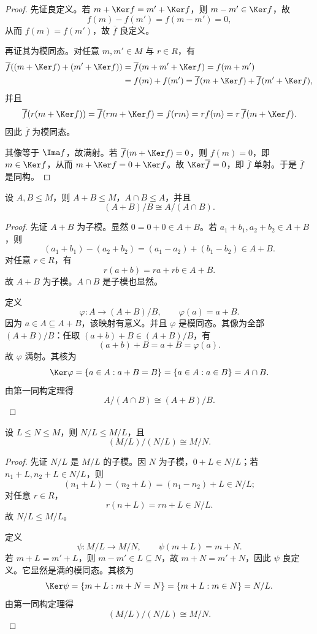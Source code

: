 \begin{proof}
先证良定义。若 $m+\Ker f=m'+\Ker f$，则 $m-m'\in \Ker f$，故
\[
f(m)-f(m')=f(m-m')=0,
\]
从而 $f(m)=f(m')$，故 $\overline f$ 良定义。

再证其为模同态。对任意 $m,m'\in M$ 与 $r\in R$，有
\begin{align*}
\overline f((m+\Ker f)+(m'+\Ker f))
&=\overline f(m+m'+\Ker f)=f(m+m')\\
&=f(m)+f(m')=\overline f(m+\Ker f)+\overline f(m'+\Ker f),
\end{align*}
并且
\[
\overline f(r(m+\Ker f))=\overline f(rm+\Ker f)=f(rm)=rf(m)=r\,\overline f(m+\Ker f).
\]
因此 $\overline f$ 为模同态。

其像等于 $\Ima f$，故满射。若 $\overline f(m+\Ker f)=0$，则 $f(m)=0$，即 $m\in \Ker f$，从而 $m+\Ker f=0+\Ker f$。故 $\Ker \overline f=0$，即 $\overline f$ 单射。于是 $\overline f$ 是同构。
\end{proof}

\begin{theorem}[第二同构定理]
设 $A,B\le M$，则 $A+B\le M$，$A\cap B\le A$，并且
\[
(A+B)/B\cong A/(A\cap B).
\]
\end{theorem}

\begin{proof}
先证 $A+B$ 为子模。显然 $0=0+0\in A+B$。若 $a_1+b_1,a_2+b_2\in A+B$，则
\[
(a_1+b_1)-(a_2+b_2)=(a_1-a_2)+(b_1-b_2)\in A+B.
\]
对任意 $r\in R$，有
\[
r(a+b)=ra+rb\in A+B.
\]
故 $A+B$ 为子模。$A\cap B$ 是子模也显然。

定义
\[
\varphi\colon A\to (A+B)/B,\qquad \varphi(a)=a+B.
\]
因为 $a\in A\subseteq A+B$，该映射有意义。并且 $\varphi$ 是模同态。其像为全部 $(A+B)/B$：任取 $(a+b)+B\in (A+B)/B$，有
\[
(a+b)+B=a+B=\varphi(a).
\]
故 $\varphi$ 满射。其核为
\[
\Ker\varphi=\{a\in A:a+B=B\}=\{a\in A:a\in B\}=A\cap B.
\]
由第一同构定理得
\[
A/(A\cap B)\cong (A+B)/B.
\]
\end{proof}

\begin{theorem}[第三同构定理]
设 $L\le N\le M$，则 $N/L\le M/L$，且
\[
(M/L)/(N/L)\cong M/N.
\]
\end{theorem}

\begin{proof}
先证 $N/L$ 是 $M/L$ 的子模。因 $N$ 为子模，$0+L\in N/L$；若 $n_1+L,n_2+L\in N/L$，则
\[
(n_1+L)-(n_2+L)=(n_1-n_2)+L\in N/L;
\]
对任意 $r\in R$，
\[
r(n+L)=rn+L\in N/L.
\]
故 $N/L\le M/L$。

定义
\[
\psi\colon M/L\to M/N,\qquad \psi(m+L)=m+N.
\]
若 $m+L=m'+L$，则 $m-m'\in L\subseteq N$，故 $m+N=m'+N$，因此 $\psi$ 良定义。它显然是满的模同态。其核为
\[
\Ker\psi=\{m+L:m+N=N\}=\{m+L:m\in N\}=N/L.
\]
由第一同构定理得
\[
(M/L)/(N/L)\cong M/N.
\]
\end{proof}

